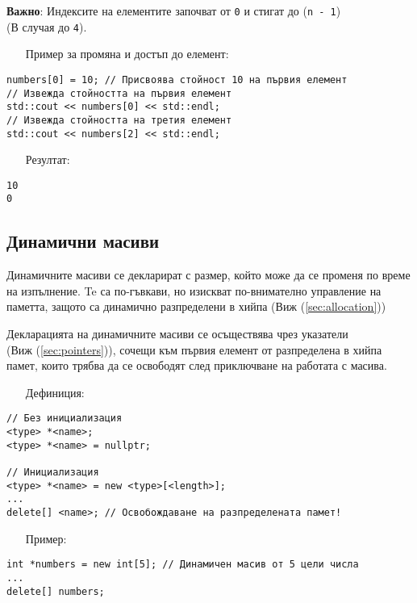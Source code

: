 \documentclass[oneside]{book}
\newcommand*{\code}[1]{\texttt{#1}}
\begin{document}
\textbf{Важно}: Индексите на елементите започват от \code{0} и стигат до (\code{n - 1})\\(В случая до \code{4}).

\begin{itemize}\item[Пример] за промяна и достъп до елемент:\end{itemize}\vspace{-12pt}
\begin{mdframed}\begin{lstlisting} 
numbers[0] = 10; // Присвоява стойност 10 на първия елемент
// Извежда стойността на първия елемент
std::cout << numbers[0] << std::endl;
// Извежда стойността на третия елемент
std::cout << numbers[2] << std::endl; 
\end{lstlisting}\end{mdframed}

\begin{itemize}\item[Резултат:]\end{itemize}\vspace{-12pt}
\begin{mdframed}\begin{lstlisting}
10
0
\end{lstlisting}\end{mdframed}

\subsection{Динамични масиви}
Динамичните масиви се декларират с размер, който може да се променя по време на изпълнение.
Te са по-гъвкави, но изискват по-внимателно управление на паметта, защото са динамично разпределени в хийпа (Виж (\ref{sec:allocation}))

Декларацията на динамичните масиви се осъществява чрез указатели\\(Виж (\ref{sec:pointers})), сочещи към първия елемент от разпределена в хийпа памет, които трябва да се освободят след приключване на работата с масива.

\begin{itemize}\item[Дефиниция:]\end{itemize}\vspace{-12pt}
\begin{mdframed}\begin{lstlisting}
// Без инициализация
<type> *<name>;
<type> *<name> = nullptr;

// Инициализация
<type> *<name> = new <type>[<length>];
...
delete[] <name>; // Освобождаване на разпределената памет!
\end{lstlisting}\end{mdframed}
\pagebreak
\begin{itemize}\item[Пример:]\end{itemize}
\begin{mdframed}\begin{lstlisting}
int *numbers = new int[5]; // Динамичен масив от 5 цели числа
...
delete[] numbers;
\end{lstlisting}\end{mdframed}
\end{document}
